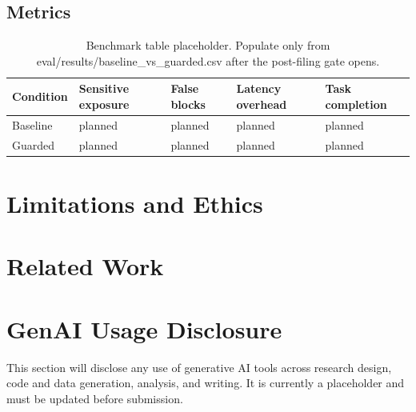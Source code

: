 \documentclass[manuscript,review,anonymous]{acmart}
\begin{document}
\subsection{Metrics}

\begin{table}[t]
  \caption{Benchmark table placeholder. Populate only from eval/results/baseline_vs_guarded.csv after the post-filing gate opens.}
  \label{tab:benchmark-placeholder}
  \centering
  \begin{tabular}{lllll}
    \toprule
    Condition & Sensitive exposure & False blocks & Latency overhead & Task completion \\
    \midrule
    Baseline & planned & planned & planned & planned \\
    Guarded & planned & planned & planned & planned \\
    \bottomrule
  \end{tabular}
\end{table}

\section{Limitations and Ethics}

\section{Related Work}

\section{GenAI Usage Disclosure}
This section will disclose any use of generative AI tools across research design, code and data generation, analysis, and writing. It is currently a placeholder and must be updated before submission.

% 
% 
\end{document}
